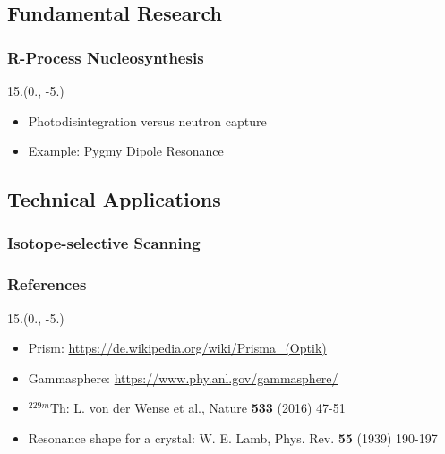 \documentclass{beamer}
\begin{document}
\subsection{Fundamental Research}

\begin{frame}
    \frametitle{R-Process Nucleosynthesis}
    \begin{textblock}{15.}(0., -5.)
        \begin{itemize}
            \item Photodisintegration versus neutron capture
            \item Example: Pygmy Dipole Resonance
        \end{itemize}
    \end{textblock}    
\end{frame}

\subsection{Technical Applications}

\begin{frame}
    \frametitle{Isotope-selective Scanning}
\end{frame}

\begin{frame}
    \frametitle{References}
    \begin{textblock}{15.}(0., -5.)
    \begin{itemize}
        \item Prism: \url{https://de.wikipedia.org/wiki/Prisma_(Optik)}
        \item Gammasphere: \url{https://www.phy.anl.gov/gammasphere/}
        \item $^{229m}$Th: L. von der Wense et al., Nature \textbf{533} (2016) 47-51
        \item Resonance shape for a crystal: W. E. Lamb, Phys. Rev. \textbf{55} (1939) 190-197
    \end{itemize}
    \end{textblock}
\end{frame}
\end{document}
